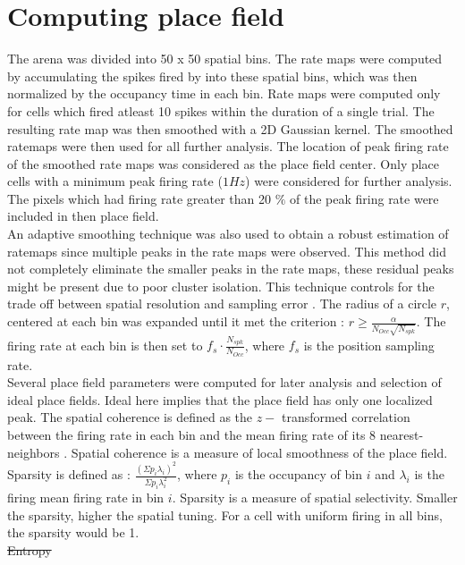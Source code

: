 \section{Computing place field}
\label{pfcompute}
The arena was divided into 50 x 50 spatial bins. The rate maps were computed by accumulating the spikes fired by into these spatial bins, which was then normalized by the occupancy time in each bin.
Rate maps were computed only for cells which fired atleast 10 spikes within the duration of a single trial. The resulting rate map was then smoothed with a 2D Gaussian kernel. The smoothed ratemaps were then used for all further analysis. The location of peak firing rate of the smoothed rate maps was considered as the place field center. Only place cells with a minimum peak firing rate ($1Hz$) were considered for further analysis. The pixels which had firing rate greater than 20 $\%$ of the peak firing rate were included in then place field.\\ 
An adaptive smoothing technique was also used to obtain a robust estimation of ratemaps since multiple peaks in the rate maps were observed. This method did not completely eliminate the smaller peaks in the rate maps, these residual peaks might be present due to poor cluster isolation. This technique controls for the trade off between spatial resolution and sampling error \cite{Skaggs1996c}. The radius of a circle $r$, centered at each bin was expanded until it met the criterion :   $ r \geq \frac{\alpha}{N_{Occ} \sqrt{N_{spk}}}$. The firing rate at each bin is then set to $f_{s} \cdot \frac{N_{spk}}{N_{Occ}}$, where $f_{s}$ is the position sampling rate.\\
Several place field parameters were computed for later analysis and selection of ideal place fields. Ideal here implies that the place field has only one localized peak. The spatial coherence is defined as the $z-$ transformed correlation between the firing rate in each bin and the mean firing rate of its 8 nearest-neighbors \cite{Muller1989}. Spatial coherence is a measure of local smoothness of the place field.\\
Sparsity is defined as : $\frac{(\Sigma p_{i} \lambda_{i})^{2}}{\Sigma p_{i} \lambda^{2}_{i}}$, where $p_{i}$ is the occupancy of bin $i$ and $\lambda_{i}$ is the firing mean firing rate in bin $i$. Sparsity is a measure of spatial selectivity. Smaller the sparsity, higher the spatial tuning. For a cell with uniform firing in all bins, the sparsity would be 1. \\
\st{Entropy} \\

